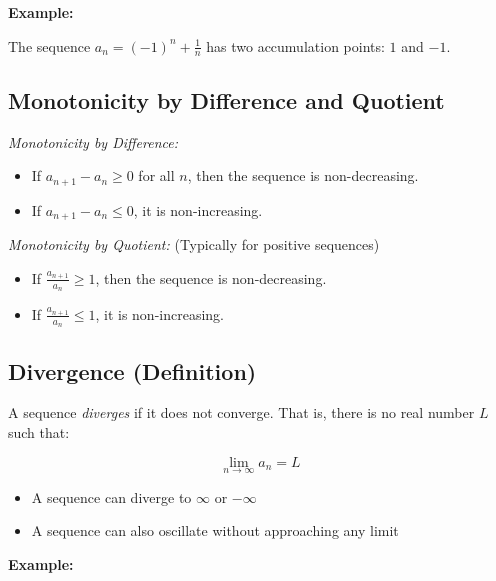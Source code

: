 \textbf{Example:}

The sequence \(a_n = {(-1)}^n + \frac{1}{n}\) has two accumulation points: \(1\) and \(-1\).

\subsection{Monotonicity by Difference and Quotient}

\emph{Monotonicity by Difference:}

\begin{itemize}

    \item If \(a_{n+1} - a_n \ge 0\) for all \(n\), then the sequence is non-decreasing.

    \item If \(a_{n+1} - a_n \le 0\), it is non-increasing.

\end{itemize}

\emph{Monotonicity by Quotient:} (Typically for positive sequences)

\begin{itemize}

    \item If \(\frac{a_{n+1}}{a_n} \ge 1\), then the sequence is non-decreasing.

    \item If \(\frac{a_{n+1}}{a_n} \le 1\), it is non-increasing.

\end{itemize}

\subsection{Divergence (Definition)}

A sequence \emph{diverges} if it does not converge. That is, there is no real number \(L\) such that:

\[
    \lim_{n \to \infty} a_n = L
\]

\begin{itemize}

    \item A sequence can diverge to \(\infty\) or \(-\infty\)

    \item A sequence can also oscillate without approaching any limit

\end{itemize}

\textbf{Example:}

